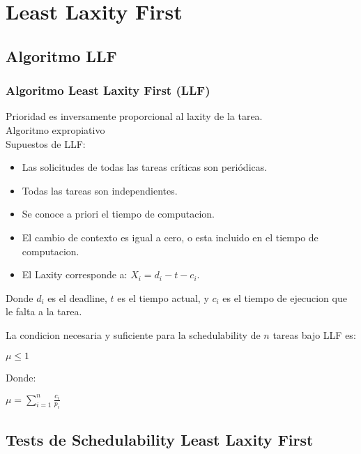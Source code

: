 \documentclass[xcolor=table]{beamer}
\begin{document}
\section{Least Laxity First}

\subsection{Algoritmo LLF}

\begin{frame} 
\frametitle{Algoritmo Least Laxity First (LLF)} 

Prioridad es inversamente proporcional al laxity de la tarea. \\
Algoritmo expropiativo\\
Supuestos de LLF:
\begin{itemize}
\item Las solicitudes de todas las tareas críticas son periódicas.
\item Todas las tareas son independientes.
\item Se conoce a priori el tiempo de computacion.
\item El cambio de contexto es igual a cero, o esta incluido en el tiempo de computacion.
\item El Laxity corresponde a: $X_i = d_i - t - c_i$.
\end{itemize} 

Donde $d_i$ es el deadline, $t$ es el tiempo actual, y $c_i$ es el tiempo de ejecucion que le falta a la tarea.

La condicion necesaria y suficiente para la schedulability de $n$ tareas bajo LLF es:
\begin{center}
$\mu \leq 1$
\end{center}

Donde:
\begin{center}
$\mu = \sum_{i=1}^{n}\frac{c_i}{p_i}$
\end{center}

\end{frame}

\subsection{Tests de Schedulability  Least Laxity First } 
\end{document}
